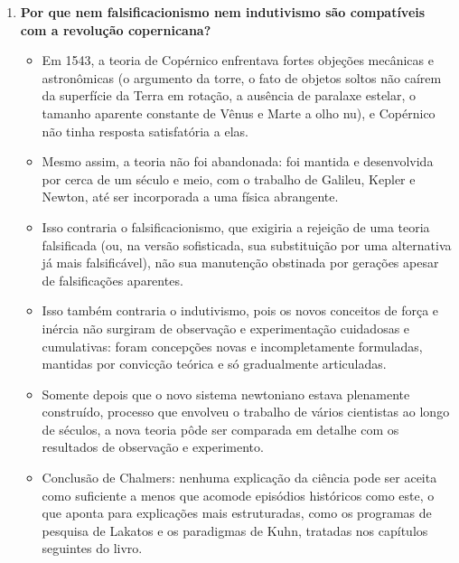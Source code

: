 \documentclass[10pt,a4paper]{extarticle}
\begin{document}
\begin{enumerate}[resume, label=\textbf{\arabic*.}, itemsep=10pt]
\item \textbf{Por que nem falsificacionismo nem indutivismo são compatíveis com a revolução copernicana?}
\begin{itemize}
  \item Em 1543, a teoria de Copérnico enfrentava fortes objeções mecânicas e astronômicas (o argumento da torre, o fato de objetos soltos não caírem da superfície da Terra em rotação, a ausência de paralaxe estelar, o tamanho aparente constante de Vênus e Marte a olho nu), e Copérnico não tinha resposta satisfatória a elas.
  \item Mesmo assim, a teoria não foi abandonada: foi mantida e desenvolvida por cerca de um século e meio, com o trabalho de Galileu, Kepler e Newton, até ser incorporada a uma física abrangente.
  \item Isso contraria o falsificacionismo, que exigiria a rejeição de uma teoria falsificada (ou, na versão sofisticada, sua substituição por uma alternativa já mais falsificável), não sua manutenção obstinada por gerações apesar de falsificações aparentes.
  \item Isso também contraria o indutivismo, pois os novos conceitos de força e inércia não surgiram de observação e experimentação cuidadosas e cumulativas: foram concepções novas e incompletamente formuladas, mantidas por convicção teórica e só gradualmente articuladas.
  \item Somente depois que o novo sistema newtoniano estava plenamente construído, processo que envolveu o trabalho de vários cientistas ao longo de séculos, a nova teoria pôde ser comparada em detalhe com os resultados de observação e experimento.
  \item Conclusão de Chalmers: nenhuma explicação da ciência pode ser aceita como suficiente a menos que acomode episódios históricos como este, o que aponta para explicações mais estruturadas, como os programas de pesquisa de Lakatos e os paradigmas de Kuhn, tratadas nos capítulos seguintes do livro.
\end{itemize}

\end{enumerate}



\end{document}
